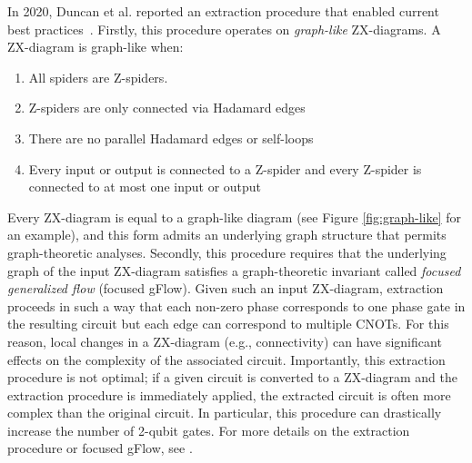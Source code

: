 In 2020, Duncan et al. reported an extraction procedure that enabled current best practices~\cite{duncan2020graph}.
Firstly, this procedure operates on \emph{graph-like} ZX-diagrams.
A ZX-diagram is graph-like when:
\begin{enumerate}
\item
  All spiders are Z-spiders.
\item
  Z-spiders are only connected via Hadamard edges
\item
  There are no parallel Hadamard edges or self-loops
\item
  Every input or output is connected to a Z-spider and every Z-spider is connected to at most one input or output
\end{enumerate}
Every ZX-diagram is equal to a graph-like diagram (see Figure \ref{fig:graph-like} for an example), and this form admits an underlying graph structure that permits graph-theoretic analyses.
Secondly, this procedure requires that the underlying graph of the input ZX-diagram satisfies a graph-theoretic invariant called \emph{focused generalized flow} (focused gFlow). %
Given such an input ZX-diagram, extraction proceeds in such a way that each non-zero phase corresponds to one phase gate in the resulting circuit but each edge can correspond to multiple CNOTs.
For this reason, local changes in a ZX-diagram (e.g., connectivity) can have significant effects on the complexity of the associated circuit.
Importantly, this extraction procedure is not optimal;
if a given circuit is converted to a ZX-diagram and the extraction procedure is immediately applied, the extracted circuit is often more complex than the original circuit.
In particular, this procedure can drastically increase the number of 2-qubit gates.
For more details on the extraction procedure or focused gFlow, see \cite{duncan2020graph}.



